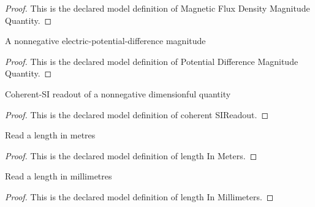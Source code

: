 \begin{proof}
  This is the declared model definition of Magnetic Flux Density Magnitude Quantity.
\end{proof}
\begin{definition}
  \label{def:physics:phyx-mini-0972:phyxminiproblems-problemphyxmini0972-potentialdifferencemagnitudequantity}
  A nonnegative electric-potential-difference magnitude
\end{definition}
\begin{proof}
  This is the declared model definition of Potential Difference Magnitude Quantity.
\end{proof}
\begin{definition}
  \label{def:physics:phyx-mini-0972:phyxminiproblems-problemphyxmini0972-coherentsireadout}
  Coherent-SI readout of a nonnegative dimensionful quantity
\end{definition}
\begin{proof}
  This is the declared model definition of coherent SIReadout.
\end{proof}
\begin{definition}
  \label{def:physics:phyx-mini-0972:phyxminiproblems-problemphyxmini0972-lengthinmeters}
  Read a length in metres
\end{definition}
\begin{proof}
  This is the declared model definition of length In Meters.
\end{proof}
\begin{definition}
  \label{def:physics:phyx-mini-0972:phyxminiproblems-problemphyxmini0972-lengthinmillimeters}
  Read a length in millimetres
\end{definition}
\begin{proof}
  This is the declared model definition of length In Millimeters.
\end{proof}
